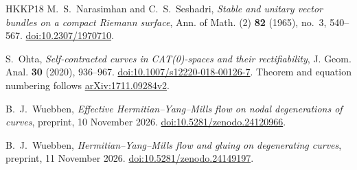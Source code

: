 \begin{thebibliography}{HKKP18}
M.~S.~Narasimhan and C.~S.~Seshadri,
\emph{Stable and unitary vector bundles on a compact Riemann surface},
Ann. of Math. (2) \textbf{82} (1965), no.~3, 540--567.
\href{https://doi.org/10.2307/1970710}{doi:10.2307/1970710}.

S.~Ohta, \emph{Self-contracted curves in CAT(0)-spaces and their rectifiability},
J. Geom. Anal. \textbf{30} (2020), 936--967.
\href{https://doi.org/10.1007/s12220-018-00126-7}{doi:10.1007/s12220-018-00126-7}.
Theorem and equation numbering follows
\href{https://arxiv.org/abs/1711.09284v2}{arXiv:1711.09284v2}.

B.~J.~Wuebben,
\emph{Effective Hermitian--Yang--Mills flow on nodal degenerations of curves},
preprint, 10 November 2026.
\href{https://doi.org/10.5281/zenodo.24120966}{doi:10.5281/zenodo.24120966}.

B.~J.~Wuebben,
\emph{Hermitian--Yang--Mills flow and gluing on degenerating curves},
preprint, 11 November 2026.
\href{https://doi.org/10.5281/zenodo.24149197}{doi:10.5281/zenodo.24149197}.
\end{thebibliography}
